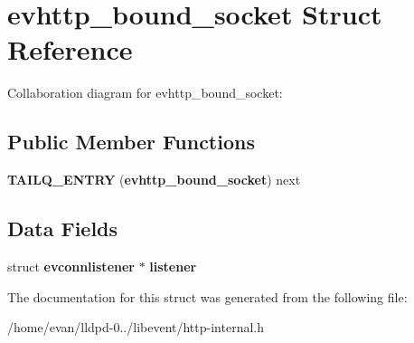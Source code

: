 \section{evhttp\-\_\-bound\-\_\-socket \-Struct \-Reference}
\label{structevhttp__bound__socket}


\-Collaboration diagram for evhttp\-\_\-bound\-\_\-socket\-:
\subsection*{\-Public \-Member \-Functions}
\begin{DoxyCompactItemize}
\item 
{\bfseries \-T\-A\-I\-L\-Q\-\_\-\-E\-N\-T\-R\-Y} ({\bf evhttp\-\_\-bound\-\_\-socket}) next\label{structevhttp__bound__socket_a307fa498c43b787b8db905c1e2f8dd27}

\end{DoxyCompactItemize}
\subsection*{\-Data \-Fields}
\begin{DoxyCompactItemize}
\item 
struct {\bf evconnlistener} $\ast$ {\bfseries listener}\label{structevhttp__bound__socket_a0fb084a5ef4d5874db805c2df1375d7b}

\end{DoxyCompactItemize}


\-The documentation for this struct was generated from the following file\-:\begin{DoxyCompactItemize}
\item 
/home/evan/lldpd-\/0../libevent/http-\/internal.\-h\end{DoxyCompactItemize}

